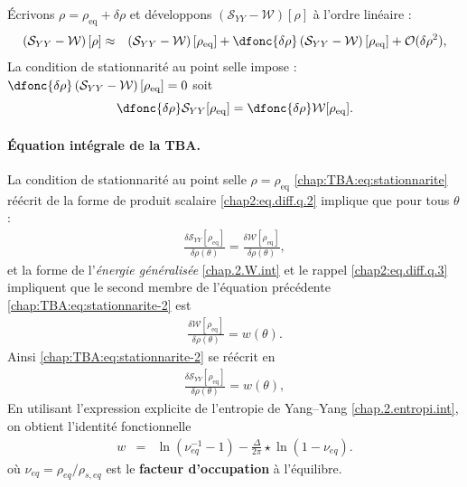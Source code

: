 Écrivons
\(
\rho=\rho_{\text{eq}}+\delta\rho
\)
et développons $(\mathcal{S}_{YY}-\mathcal{W})[\rho]$ à l’ordre linéaire :
\begin{eqnarray*}
	\left(  \mathcal{S}_{YY} - \mathcal{W }\right )[\rho] & \approx &\left(  \mathcal{S}_{YY} - \mathcal{W}\right )[ \rho_{\mathrm{eq}}] +  \dfonc{\delta \rho}\left (  \mathcal{S}_{YY} - \mathcal{W}\right )[ \rho_{\mathrm{eq}}]  + \mathcal{O}(\delta \rho^2 ) ,
	\label{chap:TBA:eq:action}	
\end{eqnarray*}	
La condition de stationnarité au point selle impose :
\(
	\dfonc{\delta \rho}\left (  \mathcal{S}_{YY} - \mathcal{W}\right )[ \rho_{\mathrm{eq}}] 	  =  0  	
\)
soit 
\begin{equation}
	\dfonc{\delta \rho} \mathcal{S}_{YY}[ \rho_{\mathrm{eq}}]  = \dfonc{\delta \rho}\mathcal{W}[ \rho_{\mathrm{eq}}] . \label{chap:TBA:eq:stationnarite}
\end{equation}

\paragraph{Équation intégrale de la TBA.}
La condition de stationnarité au point selle \(\rho=\rho_{\mathrm{eq}}\) \eqref{chap:TBA:eq:stationnarite} réécrit de la forme de produit scalaire \eqref{chap2:eq.diff.q.2} implique que pour tous $\theta$ :
\begin{eqnarray}\label{chap:TBA:eq:stationnarite-2}
	\frac{\delta\mathcal{S}_{YY}[\rho_{\mathrm{eq}}]}{\delta\rho(\theta)} = \frac{\delta\mathcal{W}[\rho_{\mathrm{eq}}]}{\delta\rho(\theta)},
\end{eqnarray}
et la forme de l'{\em énergie généralisée} \eqref{chap.2.W.int} et le rappel \eqref{chap2:eq.diff.q.3} impliquent que le second membre de l'équation précédente \eqref{chap:TBA:eq:stationnarite-2} est 
\begin{eqnarray}
	\frac{\delta\mathcal{W}[\rho_{\mathrm{eq}}]}{\delta\rho(\theta)}  = w(\theta).
\end{eqnarray}	
Ainsi \eqref{chap:TBA:eq:stationnarite-2} se réécrit en 
\begin{eqnarray}
	\frac{\delta\mathcal{S}_{YY}[\rho_{\mathrm{eq}}]}{\delta\rho(\theta)} = w(\theta),\label{chap:TBA:eq:stationnarite-3}
\end{eqnarray}
En utilisant l’expression explicite de l’entropie de Yang–Yang \eqref{chap.2.entropi.int}, on obtient l’identité fonctionnelle
\begin{eqnarray}
	w & = & \ln ( \nu_{\!eq}^{-1}  - 1 ) - \frac{\Delta}{2\pi} \star \ln ( 1 -  \nu_{\!eq}).\label{chap:TBA:eq:w}
\end{eqnarray}
où
\(
\nu_{\!eq}=\rho_{\!eq}/\rho_{s,\!eq}
\)
est le \textbf{facteur d’occupation} à l’équilibre.
